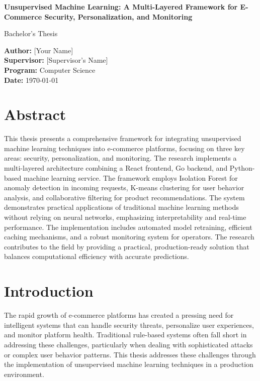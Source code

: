 \documentclass[12pt]{article}
\begin{document}
\begin{titlepage}
    \begin{center}
        \vspace*{2cm}
        
        \Huge
        \textbf{Unsupervised Machine Learning: A Multi-Layered Framework for E-Commerce Security, Personalization, and Monitoring}
        
        \vspace{1.5cm}
        
        \Large
        Bachelor's Thesis
        
        \vspace{2cm}
        
        \large
        \textbf{Author:} [Your Name]\\
        \textbf{Supervisor:} [Supervisor's Name]\\
        \textbf{Program:} Computer Science\\
        \textbf{Date:} \today
        
    \end{center}
\end{titlepage}

\tableofcontents
\newpage

\section*{Abstract}
This thesis presents a comprehensive framework for integrating unsupervised machine learning techniques into e-commerce platforms, focusing on three key areas: security, personalization, and monitoring. The research implements a multi-layered architecture combining a React frontend, Go backend, and Python-based machine learning service. The framework employs Isolation Forest for anomaly detection in incoming requests, K-means clustering for user behavior analysis, and collaborative filtering for product recommendations. The system demonstrates practical applications of traditional machine learning methods without relying on neural networks, emphasizing interpretability and real-time performance. The implementation includes automated model retraining, efficient caching mechanisms, and a robust monitoring system for operators. The research contributes to the field by providing a practical, production-ready solution that balances computational efficiency with accurate predictions.

\section{Introduction}
The rapid growth of e-commerce platforms has created a pressing need for intelligent systems that can handle security threats, personalize user experiences, and monitor platform health. Traditional rule-based systems often fall short in addressing these challenges, particularly when dealing with sophisticated attacks or complex user behavior patterns. This thesis addresses these challenges through the implementation of unsupervised machine learning techniques in a production environment.
\end{document}
